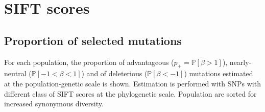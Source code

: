 \documentclass{article}
\newcommand{\proba}{\mathbb{P}}
\newcommand{\Spop}{\beta}
\newcommand{\polyDel}{\Spop < -1}
\newcommand{\polyNeutral}{-1 < \Spop < 1}
\newcommand{\polyAdv}{ \Spop > 1}
\newcommand{\PpolyDel}{\proba \left[ \polyDel \right]}
\newcommand{\PpolyNeutral}{\proba \left[ \polyNeutral \right]}
\newcommand{\PpolyAdv}{\proba \left[ \polyAdv \right]}
\begin{document}
    

    \newpage


    \section{SIFT scores}\label{sec:sift-scores}

    \subsection{Proportion of selected mutations}\label{subsec:proportion-of-selected-mutations}
    For each population, the proportion of advantageous ($p_+=\PpolyAdv$), nearly-neutral ($\PpolyNeutral$) and of deleterious ($\PpolyDel$) mutations estimated at the population-genetic scale is shown.
    Estimation is performed with SNPs with different class of SIFT scores at the phylogenetic scale.
    Population are sorted for increased synonymous diversity.
\end{document}
